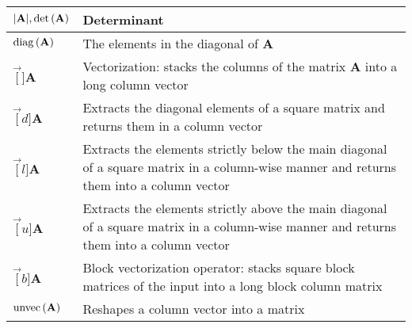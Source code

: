\documentclass{article}
\begin{document}
\begin{xltabular}{\textwidth}{XX}
	\(\abs{\mathbf{A}}, \textnormal{det}\left( \mathbf{A} \right)\)                                      & Determinant                                                                                                                                                                     \\ \hline
	\(\operatorname{diag}\left(\mathbf{A}\right)\)                                                                                & The elements in the diagonal of \(\mathbf{A}\)                                                                                                                                  \\ \hline
	\(\vec[]{\mathbf{A}}\)                                                                               & Vectorization: stacks the columns of the matrix \(\mathbf{A}\) into a long column vector                                                                                        \\ \hline
	\(\vec[d]{\mathbf{A}}\)                                                                              & Extracts the diagonal elements of a square matrix and returns them
	in a column vector                                                                                                                                                                                                                                                                     \\ \hline
	\(\vec[l]{\mathbf{A}}\)                                                                              & Extracts the elements strictly below the main diagonal of a square matrix in a column-wise manner and returns them into a column vector                                         \\ \hline
	\(\vec[u]{\mathbf{A}}\)                                                                              & Extracts the elements strictly above the main diagonal of a square matrix in a column-wise manner and returns them into a column vector                                         \\ \hline
	\(\vec[b]{\mathbf{A}}\)                                                                              & Block vectorization operator: stacks square block matrices of the input into a long block column matrix                                                                         \\ \hline
	\(\operatorname{unvec}\left(\mathbf{A}\right)\)                                                                               & Reshapes a column vector into a matrix                                                                                                                                          \\ \hline

\end{xltabular}
\end{document}
